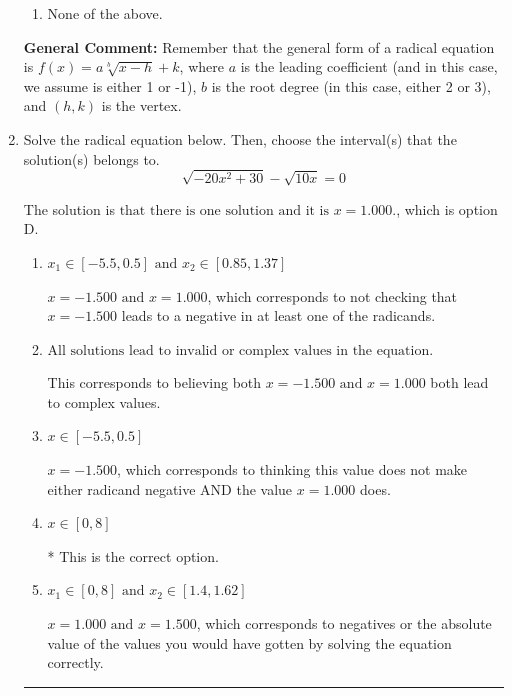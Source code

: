 \documentclass{extbook}[14pt]
\newcommand{\litem}[1]{\item #1

\rule{\textwidth}{0.4pt}}
\begin{document}
\begin{enumerate}
{\begin{enumerate}[label=\Alph*.]
\item None of the above.\end{enumerate}
\textbf{General Comment:} Remember that the general form of a radical equation is $ f(x) = a \sqrt[b]{x - h} + k $, where $a$ is the leading coefficient (and in this case, we assume is either 1 or -1), $b$ is the root degree (in this case, either 2 or 3), and $(h, k)$ is the vertex.
}
\litem{
Solve the radical equation below. Then, choose the interval(s) that the solution(s) belongs to.
\[ \sqrt{-20 x^2 + 30} - \sqrt{10 x} = 0 \]

The solution is \( \text{that there is one solution and it is } x = 1.000. \), which is option D.\begin{enumerate}[label=\Alph*.]
\item \( x_1 \in [-5.5, 0.5] \text{ and } x_2 \in [0.85,1.37] \)

$x = -1.500 \text{ and } x = 1.000$, which corresponds to not checking that $x = -1.500$ leads to a negative in at least one of the radicands.
\item \( \text{All solutions lead to invalid or complex values in the equation.} \)

This corresponds to believing both $x = -1.500 \text{ and } x = 1.000$ both lead to complex values.
\item \( x \in [-5.5,0.5] \)

$x = -1.500$, which corresponds to thinking this value does not make either radicand negative AND the value $x = 1.000$ does.
\item \( x \in [0,8] \)

* This is the correct option.
\item \( x_1 \in [0, 8] \text{ and } x_2 \in [1.4,1.62] \)

$x = 1.000 \text{ and } x = 1.500$, which corresponds to negatives or the absolute value of the values you would have gotten by solving the equation correctly.
\end{enumerate}

}
\end{enumerate}
\end{document}
